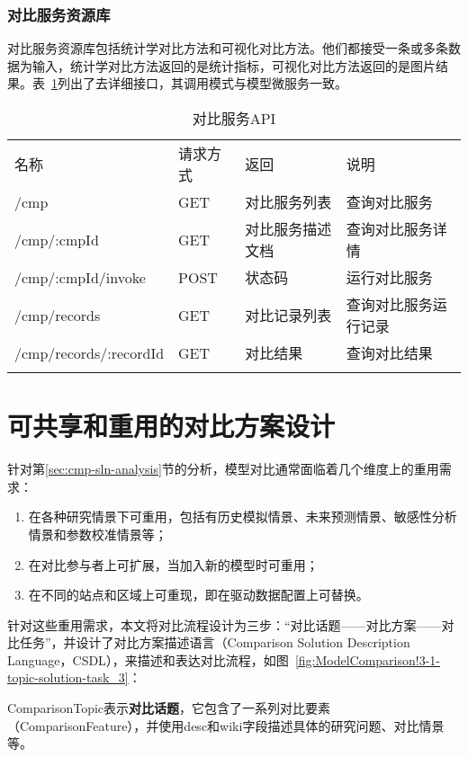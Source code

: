 \subsubsection{对比服务资源库}
对比服务资源库包括统计学对比方法和可视化对比方法。他们都接受一条或多条数据为输入，统计学对比方法返回的是统计指标，可视化对比方法返回的是图片结果。表~\ref{tab:cmp-service-API}列出了去详细接口，其调用模式与模型微服务一致。

\begin{table}[!htbp]
    \centering
    \caption{对比服务API}
    \label{tab:cmp-service-API}
    \begin{tabular}{llll}
        \Xhline{1.5pt}
        名称 & 请求方式 & 返回 & 说明 \\
        \Xhline{1.5pt}
        /cmp & GET & 对比服务列表 & 查询对比服务 \\
        /cmp/:cmpId & GET & 对比服务描述文档 & 查询对比服务详情 \\
        /cmp/:cmpId/invoke & POST & 状态码 & 运行对比服务 \\ 
        /cmp/records & GET & 对比记录列表 & 查询对比服务运行记录 \\
        /cmp/records/:recordId & GET & 对比结果 & 查询对比结果 \\
        \Xhline{1.5pt}
    \end{tabular}
\end{table}

\section{可共享和重用的对比方案设计}
\label{sec:cmp-CSDL}
针对第\ref{sec:cmp-sln-analysis}节的分析，模型对比通常面临着几个维度上的重用需求：
\begin{enumerate}[(1)]
    \item 在各种研究情景下可重用，包括有历史模拟情景、未来预测情景、敏感性分析情景和参数校准情景等；
    \item 在对比参与者上可扩展，当加入新的模型时可重用；
    \item 在不同的站点和区域上可重现，即在驱动数据配置上可替换。
\end{enumerate}

针对这些重用需求，本文将对比流程设计为三步：“对比话题——对比方案——对比任务”，并设计了对比方案描述语言（Comparison Solution Description Language，CSDL），来描述和表达对比流程，如图~\ref{fig:ModelComparison!3-1-topic-solution-task_3}：

ComparisonTopic表示\textbf{对比话题}，它包含了一系列对比要素（ComparisonFeature），并使用desc和wiki字段描述具体的研究问题、对比情景等。

